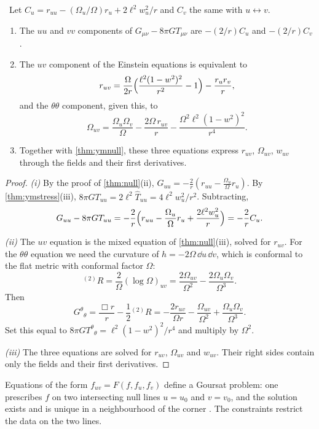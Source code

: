 \begin{theorem}\label{thm:goursat}\ver\
Let $C_u=r_{uu}-(\Omega_u/\Omega)r_u+2\ell^2w_u^2/r$ and $C_v$ the same with $u\leftrightarrow v$.
\begin{enumerate}[label=(\roman*)]
\item The $uu$ and $vv$ components of $G_{\mu\nu}-8\pi GT_{\mu\nu}$ are $-(2/r)C_u$ and $-(2/r)C_v$.
\item The $uv$ component of the Einstein equations is equivalent to
\[
r_{uv}=\frac{\Omega}{2r}\Bigl(\frac{\ell^2(1-w^2)^2}{r^2}-1\Bigr)-\frac{r_ur_v}{r},
\]
and the $\theta\theta$ component, given this, to
\[
\Omega_{uv}=\frac{\Omega_u\Omega_v}{\Omega}-\frac{2\Omega\,r_{uv}}{r}-\frac{\Omega^2\ell^2(1-w^2)^2}{r^4}.
\]
\item Together with \cref{thm:ymnull}, these three equations express $r_{uv}$, $\Omega_{uv}$, $w_{uv}$ through the fields and their first derivatives.
\end{enumerate}
\end{theorem}
\begin{proof}
\emph{(i)} By the proof of \cref{thm:null}(ii), $G_{uu}=-\frac2r(r_{uu}-\frac{\Omega_u}\Omega r_u)$. By \cref{thm:ymstress}(iii), $8\pi GT_{uu}=2\ell^2\hat T_{uu}=4\ell^2w_u^2/r^2$. Subtracting,
\[
G_{uu}-8\pi GT_{uu}=-\frac2r\Bigl(r_{uu}-\frac{\Omega_u}\Omega r_u+\frac{2\ell^2w_u^2}r\Bigr)=-\frac2rC_u .
\]

\emph{(ii)} The $uv$ equation is the mixed equation of \cref{thm:null}(iii), solved for $r_{uv}$. For the $\theta\theta$ equation we need the curvature of $h=-2\Omega\,\dd u\,\dd v$, which is conformal to the flat metric with conformal factor $\Omega$:
\[
{}^{(2)}\!R=\frac2\Omega(\log\Omega)_{uv}=\frac{2\Omega_{uv}}{\Omega^2}-\frac{2\Omega_u\Omega_v}{\Omega^3}.
\]
Then
\[
G^\theta{}_\theta=\frac{\Box r}r-\frac12{}^{(2)}\!R=-\frac{2r_{uv}}{\Omega r}-\frac{\Omega_{uv}}{\Omega^2}+\frac{\Omega_u\Omega_v}{\Omega^3}.
\]
Set this equal to $8\pi GT^\theta{}_\theta=\ell^2(1-w^2)^2/r^4$ and multiply by $\Omega^2$.

\emph{(iii)} The three equations are solved for $r_{uv}$, $\Omega_{uv}$ and $w_{uv}$. Their right sides contain only the fields and their first derivatives.
\end{proof}


Equations of the form $f_{uv}=F(f,f_u,f_v)$ define a Goursat problem: one prescribes $f$ on two intersecting null lines $u=u_0$ and $v=v_0$, and the solution exists and is unique in a neighbourhood of the corner \cite{Goursat}. The constraints restrict the data on the two lines.

